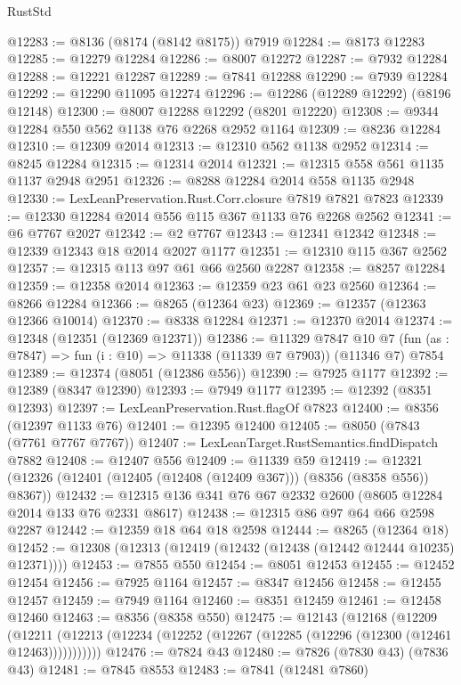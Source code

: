 \begin{lexlean}{RustStd}
\begin{coremodule}
{\begin{coremodule}
{{{{{{{{{{{{{{{{{{{{{{{{{{{{{{{{{{{{{{{{{{{{{{{{{{{{{{@12283 := @8136 (@8174 (@8142 @8175)) @7919
@12284 := @8173 @12283
@12285 := @12279 @12284
@12286 := @8007 @12272
@12287 := @7932 @12284
@12288 := @12221 @12287
@12289 := @7841 @12288
@12290 := @7939 @12284
@12292 := @12290 @11095 @12274
@12296 := @12286 (@12289 @12292) (@8196 @12148)
@12300 := @8007 @12288 @12292 (@8201 @12220)
@12308 := @9344 @12284 @550 @562 @1138 @76 @2268 @2952 @1164
@12309 := @8236 @12284
@12310 := @12309 @2014
@12313 := @12310 @562 @1138 @2952
@12314 := @8245 @12284
@12315 := @12314 @2014
@12321 := @12315 @558 @561 @1135 @1137 @2948 @2951
@12326 := @8288 @12284 @2014 @558 @1135 @2948
@12330 := LexLeanPreservation.Rust.Corr.closure @7819 @7821 @7823
@12339 := @12330 @12284 @2014 @556 @115 @367 @1133 @76 @2268 @2562
@12341 := @6 @7767 @2027
@12342 := @2 @7767
@12343 := @12341 @12342
@12348 := @12339 @12343 @18 @2014 @2027 @1177
@12351 := @12310 @115 @367 @2562
@12357 := @12315 @113 @97 @61 @66 @2560 @2287
@12358 := @8257 @12284
@12359 := @12358 @2014
@12363 := @12359 @23 @61 @23 @2560
@12364 := @8266 @12284
@12366 := @8265 (@12364 @23)
@12369 := @12357 (@12363 @12366 @10014)
@12370 := @8338 @12284
@12371 := @12370 @2014
@12374 := @12348 (@12351 (@12369 @12371))
@12386 := @11329
    @7847
    @10
    @7
    (fun (as : @7847) => fun (i : @10) => @11338 (@11339 @7 @7903))
    (@11346 @7)
    @7854
@12389 := @12374 (@8051 (@12386 @556))
@12390 := @7925 @1177
@12392 := @12389 (@8347 @12390)
@12393 := @7949 @1177
@12395 := @12392 (@8351 @12393)
@12397 := LexLeanPreservation.Rust.flagOf @7823
@12400 := @8356 (@12397 @1133 @76)
@12401 := @12395 @12400
@12405 := @8050 (@7843 (@7761 @7767 @7767))
@12407 := LexLeanTarget.RustSemantics.findDispatch @7882
@12408 := @12407 @556
@12409 := @11339 @59
@12419 := @12321 (@12326 (@12401 (@12405 (@12408 (@12409 @367))) (@8356 (@8358 @556)) @8367))
@12432 := @12315 @136 @341 @76 @67 @2332 @2600 (@8605 @12284 @2014 @133 @76 @2331 @8617)
@12438 := @12315 @86 @97 @64 @66 @2598 @2287
@12442 := @12359 @18 @64 @18 @2598
@12444 := @8265 (@12364 @18)
@12452 := @12308 (@12313 (@12419 (@12432 (@12438 (@12442 @12444 @10235) @12371))))
@12453 := @7855 @550
@12454 := @8051 @12453
@12455 := @12452 @12454
@12456 := @7925 @1164
@12457 := @8347 @12456
@12458 := @12455 @12457
@12459 := @7949 @1164
@12460 := @8351 @12459
@12461 := @12458 @12460
@12463 := @8356 (@8358 @550)
@12475 := @12143
    (@12168
      (@12209
        (@12211 (@12213 (@12234 (@12252 (@12267 (@12285 (@12296 (@12300 (@12461 @12463)))))))))))
@12476 := @7824 @43
@12480 := @7826 (@7830 @43) (@7836 @43)
@12481 := @7845 @8553
@12483 := @7841 (@12481 @7860)
}}}}}}}}}}}}}}}}}}}}}}}}}}}}}}}}}}}}}}}}}}}}}}}}}}}}}}
\end{coremodule}}
\end{coremodule}
\end{lexlean}
